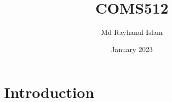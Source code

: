 \documentclass{article}
\title{COMS512}
\author{Md Rayhanul Islam}
\date{January 2023}
\begin{document}
\maketitle

\section{Introduction}
\end{document}
